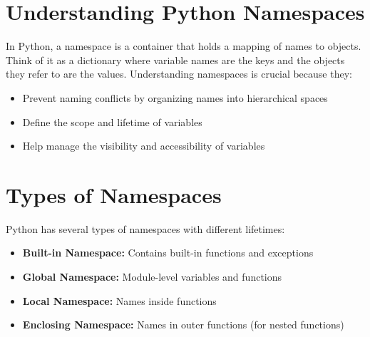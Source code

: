 \newcommand{\finalpagecontents}{%
    \AddToShipoutPicture*{\BackgroundPic}
    \vspace*{3cm}
    \begin{flushleft}
    \languagetag{Feedback}\\[0.4cm]
    {\fontsize{46}{52}\bfseries\color{primaryColor}Found this \color{accentColor}helpful?\par}
    \vspace{0.3cm}
    {\fontsize{18}{52}\color{secondaryColor}Save, comment and share\par}  
    \vspace{0.3cm}
    {\color{secondaryColor}\today\par}
    \end{flushleft}
}


\setlength{\parindent}{0pt}
\begin{titlepage}
    \titlepagecontents
\end{titlepage}

\section{Understanding Python Namespaces}

In Python, a namespace is a container that holds a mapping of names to objects. Think of it as a dictionary where variable names are the keys and the objects they refer to are the values. Understanding namespaces is crucial because they:

\begin{itemize}
    \item Prevent naming conflicts by organizing names into hierarchical spaces
    \item Define the scope and lifetime of variables
    \item Help manage the visibility and accessibility of variables
\end{itemize}

\section{Types of Namespaces}

Python has several types of namespaces with different lifetimes:

\begin{itemize}
    \item \textbf{Built-in Namespace:} Contains built-in functions and exceptions
    \item \textbf{Global Namespace:} Module-level variables and functions
    \item \textbf{Local Namespace:} Names inside functions
    \item \textbf{Enclosing Namespace:} Names in outer functions (for nested functions)
\end{itemize}

